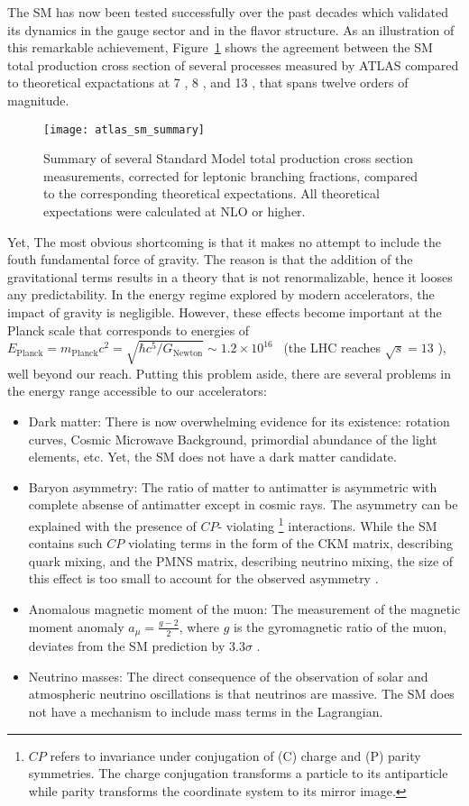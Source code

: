The SM has now been tested successfully over the past decades which validated its dynamics in the gauge sector and in the flavor structure.
As an illustration of this remarkable achievement, Figure~\ref{fig:theory.sm.summary} shows the agreement between the SM total production cross section
of several processes measured by ATLAS compared to theoretical expactations at 7 \TeV, 8 \TeV, and 13 \TeV, that spans twelve orders of magnitude.
\begin{figure}[htb!]
\centering
\texttt{[image: atlas\_sm\_summary]}
\caption{Summary of several Standard Model total production cross section measurements, corrected for leptonic branching fractions, compared to the corresponding theoretical expectations. All theoretical expectations were calculated at NLO or higher.}
\label{fig:theory.sm.summary}
\end{figure} 
Yet, 
The most obvious shortcoming is that it makes no attempt to include the fouth fundamental force of gravity. 
The reason is that the addition of the gravitational terms results in a theory that is not renormalizable, hence 
it looses any predictability.
In the energy regime explored by modern accelerators, the impact of gravity is negligible. 
However, these effects become important at the Planck scale that corresponds to energies of 
$E_\text{Planck} = m_\text{Planck} c^2 = \sqrt{\hbar c^5/G_\text{Newton}} \sim 1.2 \times 10^{16}$ \TeV~(the LHC reaches $\sqrt{s}=13$ \TeV), 
well beyond our reach. 
Putting this problem aside, there are several problems in the energy range accessible to our accelerators:
\begin{itemize}
\item Dark matter: There is now overwhelming evidence for its existence: rotation curves, Cosmic Microwave Background, primordial abundance of the light elements, etc. 
Yet, the SM does not have a dark matter candidate\cite{Bertone:2004pz}.
\item Baryon asymmetry: The ratio of matter to antimatter is asymmetric with complete absense of antimatter except in cosmic rays.
The asymmetry can be explained with the presence of $CP$-
violating
\footnote{$CP$ refers to invariance under conjugation of (C) charge and (P) parity symmetries. 
The charge conjugation transforms a particle to its antiparticle while parity transforms the coordinate system to its mirror image.}
interactions. While the SM contains such $CP$ violating terms in the form of the CKM matrix, describing  quark mixing, and the PMNS matrix, describing neutrino 
mixing, the size of this effect is too small to account for the observed asymmetry \cite{Canetti:2012zc}.
\item Anomalous magnetic moment of the muon: The measurement of the magnetic moment anomaly $a_\mu = \frac{g-2}{2}$, where $g$ is the gyromagnetic ratio of the muon, 
deviates from the SM prediction by 3.3$\sigma$ \cite{PhysRevD.73.072003,Hagiwara:2011af}.
\item Neutrino masses: The direct consequence of the observation of solar and atmospheric neutrino oscillations is that neutrinos are massive. The SM does not have a mechanism to include 
mass terms in the Lagrangian\cite{pdg}.
\end{itemize}
